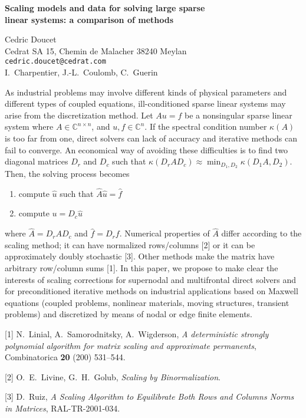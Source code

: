 \documentclass{report}
\begin{document}

\begin{center}
{\large
{\bf Scaling models and data for solving large sparse \\
linear systems: a comparison of methods}}

	Cedric Doucet \\
	Cedrat SA 15, Chemin de Malacher 38240 Meylan \\
	{\tt cedric.doucet@cedrat.com} \\
	I.~Charpentier, J.-L.~Coulomb, C.~Guerin
\end{center}
As industrial problems may involve different kinds of
physical parameters and different types of coupled
equations, ill-conditioned sparse linear systems may arise
from the discretization method. Let $Au=f$ be a nonsingular
sparse linear system where $A\in \mathbb{C}^{n\times n}$,
and $u,f\in \mathbb{C}^n$. If the spectral condition number
$\kappa(A)$ is too far from one, direct solvers can lack of
accuracy and iterative methods can fail to converge. An
economical way of avoiding these difficulties is to find two
diagonal matrices $D_r$ and $D_c$ such that
$\kappa(D_rAD_c) \approx
\min_{D_1,D_2} \kappa(D_1A,D_2)$.
Then,
the solving process becomes \begin{enumerate} \item compute
$\hat{u}$ such that $\hat{A}\hat{u}=\hat{f}$ \item compute
$u = D_c\hat{u}$ \end{enumerate} where $\hat{A}= D_rAD_c$
and $\hat{f}=D_rf$.
Numerical properties of $\hat{A}$ differ
according to the scaling method; it can have normalized
rows/columns [2] or it can be approximately doubly
stochastic [3]. Other methods make the matrix have arbitrary
row/column sums [1]. In this paper, we propose to make clear
the interests of scaling corrections for supernodal and
multifrontal direct solvers and for preconditioned iterative
methods on industrial applications based on Maxwell
equations (coupled problems, nonlinear materials, moving
structures, transient problems) and discretized by means of
nodal or edge finite elements.

[1] N.~Linial, A.~Samorodnitsky,
A.~Wigderson, {\em A deterministic strongly polynomial
algorithm for matrix scaling and approximate permanents},
Combinatorica {\bf 20} (200) 531--544.

[2] O.~E.~Livine, G.~H.~Golub,
{\em Scaling by Binormalization}.

[3] D.~Ruiz, {\em A Scaling Algorithm to Equilibrate
Both Rows and Columns Norms in Matrices}, RAL-TR-2001-034.



\end{document}
